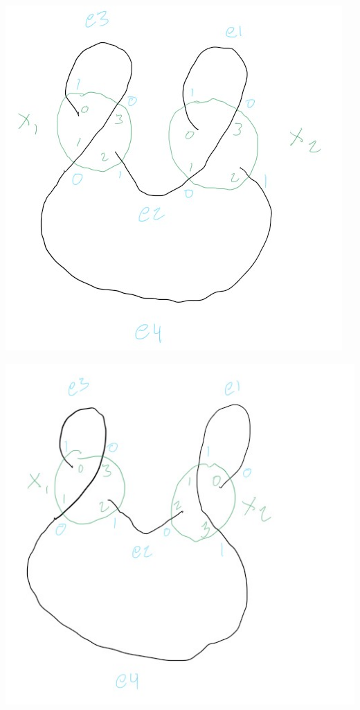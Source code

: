 \includegraphics[scale=0.5]{test_spatial_graph_diagrams/images/r1_double_loop_same_orientation}

\includegraphics[scale=0.5]{test_spatial_graph_diagrams/images/r1_double_loop_opposite_orientation}


